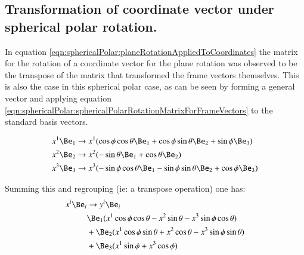 \subsection{Transformation of coordinate vector under spherical polar rotation. }

In equation \ref{eqn:sphericalPolar:planeRotationAppliedToCoordinates} the matrix for the rotation of a coordinate vector for the plane rotation
was observed to be the transpose of the matrix that transformed the frame vectors themselves.  This is also the case
in this spherical polar case, as can be seen by forming a general vector and applying equation 
\ref{eqn:sphericalPolar:sphericalPolarRotationMatrixForFrameVectors} to the standard basis vectors.

\begin{align*}
x^1 \Be_1 &\rightarrow x^1 ( \cos\phi \cos\theta \Be_1 + \cos\phi \sin\theta \Be_2 + \sin\phi \Be_3 ) \\
x^2 \Be_2 &\rightarrow x^2 ( - \sin\theta \Be_1 + \cos\theta \Be_2 ) \\
x^3 \Be_3 &\rightarrow x^3 ( - \sin\phi \cos\theta \Be_1 - \sin\phi \sin\theta \Be_2 + \cos\phi \Be_3 )
\end{align*}

Summing this and regrouping (ie: a transpose operation) one has:
\begin{align*}
x^i \Be_i &\rightarrow y^i \Be_i \\
& \Be_1 ( x^1 \cos\phi \cos\theta - x^2 \sin\theta - x^3 \sin\phi \cos\theta ) \\
& + \Be_2 ( x^1 \cos\phi \sin\theta + x^2 \cos\theta - x^3 \sin\phi \sin\theta ) \\
& + \Be_3 ( x^1 \sin\phi + x^3 \cos\phi ) \\
\end{align*}

